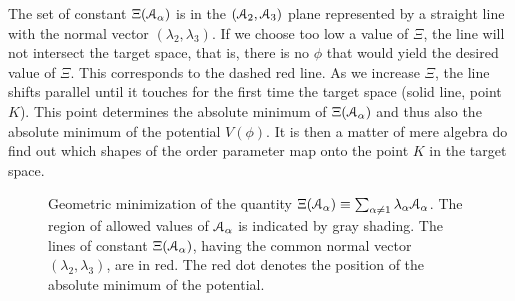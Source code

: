 \documentclass[final,2p,times,12pt,sort&compress]{elsarticle}
\newcommand\AP{\EuScript{A}}                %
\begin{document}
The set of constant $\Xi(\AP_\alpha)$ is in the $(\AP_2,\AP_3)$ plane
represented by a straight line with the normal vector $(\lambda_2,\lambda_3)$.
If we choose too low a value of $\Xi$, the line will not intersect the target
space, that is, there is no $\phi$ that would yield the desired value of
$\Xi$. This corresponds to the dashed red line. As we increase $\Xi$, the line
shifts parallel until it touches for the first time the target space (solid
line, point $K$). This point determines the absolute minimum of
$\Xi(\AP_\alpha)$ and thus also the absolute minimum of the potential
$V(\phi)$. It is then a matter of mere algebra do find out which shapes of the
order parameter map onto the point $K$ in the target space.
\begin{figure}
\begin{center}
\end{center}
\caption{Geometric minimization of the quantity
$\Xi(\AP_\alpha)\equiv\sum_{\alpha\neq1}\lambda_\alpha\AP_\alpha$. The region
of allowed values of $\AP_\alpha$ is indicated by gray shading. The lines of
constant $\Xi(\AP_\alpha)$, having the common normal vector
$(\lambda_2,\lambda_3)$, are in red. The red dot denotes the position of the
absolute minimum of the potential.}
\label{fig:Kim}
\end{figure}
\end{document}
